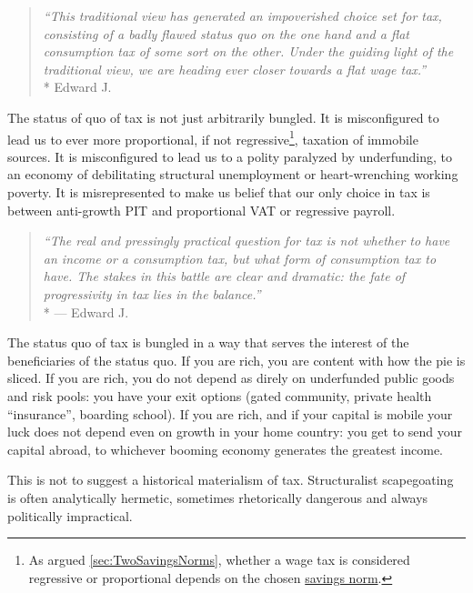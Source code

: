\begin{quote}
	\emph{``This traditional view has generated an impoverished choice set for tax, consisting of a badly flawed status quo on the one hand and a flat consumption tax of some sort on the other.
	Under the guiding light of the traditional view, we are heading ever closer towards a flat wage tax.''}
	\\*
	Edward J.\ \citet[812]{McCaffery2005}
\end{quote}

The status of quo of tax is not just arbitrarily bungled.
It is misconfigured to lead us to ever more proportional, if not regressive\footnote{As argued \autoref{sec:TwoSavingsNorms}, whether a wage tax is considered regressive or proportional depends on the chosen \hyperref[sec:TwoSavingsNorms]{savings norm}.}, taxation of immobile sources.
It is misconfigured to lead us to a polity paralyzed by underfunding, to an economy of debilitating structural unemployment or heart-wrenching working poverty.
It is misrepresented to make us belief that our only choice in tax is between anti-growth PIT and proportional VAT or regressive payroll.

\begin{quote}
	\emph{``The real and pressingly practical question for tax is not whether to have an income or a consumption tax, but what form of consumption tax to have.
	The stakes in this battle are clear and dramatic:
	the fate of progressivity in tax lies in the balance.''}
	\\*
	--- Edward J.\ \citet[817]{McCaffery2005}
\end{quote}

The status quo of tax is bungled in a way that serves the interest of the beneficiaries of the status quo.
If you are rich, you are content with how the pie is sliced.
If you are rich, you do not depend as direly on underfunded public goods and risk pools:
you have your exit options (gated community, private health ``insurance'', boarding school).
If you are rich, and if your capital is mobile your luck does not depend even on growth in your home country:
you get to send your capital abroad, to whichever booming economy generates the greatest income.

This is not to suggest a historical materialism of tax.
Structuralist scapegoating is often analytically hermetic, sometimes rhetorically dangerous and always politically impractical.

